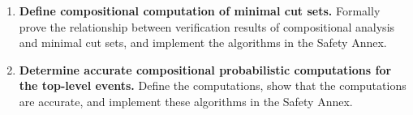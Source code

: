 \begin{enumerate}
\item \textbf{Define compositional computation of minimal cut sets.} Formally prove the relationship between verification results of compositional analysis and minimal cut sets, and implement the algorithms in the Safety Annex.

\item \textbf{Determine accurate compositional probabilistic computations for the top-level events.} Define the computations, show that the computations are accurate, and implement these algorithms in the Safety Annex.


\end{enumerate}
